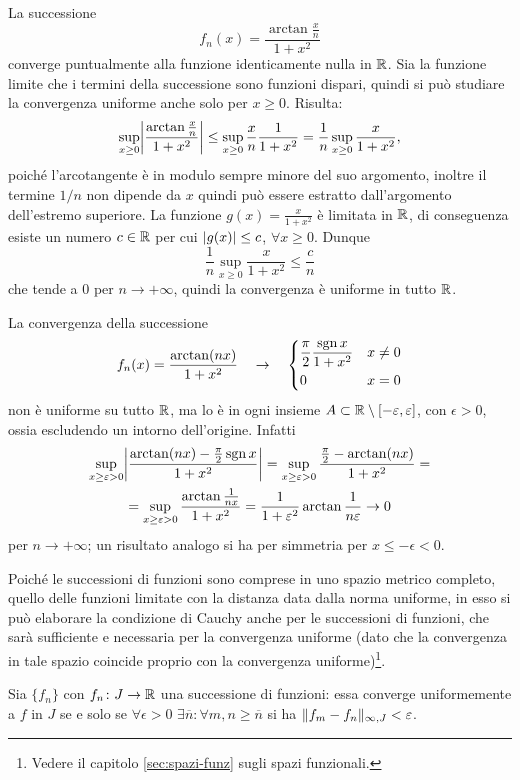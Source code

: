 \begin{esempio} \label{es:convergenza-uniforme-successioni-2}
	La successione
	\[
	f_n(x)=\frac{\arctan\frac{x}{n}}{1+x^2}
	\]
	converge puntualmente alla funzione identicamente nulla in $\R$. Sia la funzione limite che i termini della successione sono funzioni dispari, quindi si può studiare la convergenza uniforme anche solo per $x\geq 0$. Risulta:
	\[
		\sup_{x\geq 0}\abs[\bigg]{\frac{\arctan\frac{x}{n}}{1+x^2}}\leq\sup_{x\geq 0}\frac{x}{n}\frac1{1+x^2}=\frac1{n}\sup_{x\geq 0}\frac{x}{1+x^2},
	\]
	poiché l'arcotangente è in modulo sempre minore del suo argomento, inoltre il termine $1/n$ non dipende da $x$ quindi può essere estratto dall'argomento dell'estremo superiore. La funzione $g(x)=\frac{x}{1+x^2}$ è limitata in $\R$, di conseguenza esiste un numero $c\in\R$ per cui $\abs{g(x)}\leq c$, $\forall x\geq 0$. Dunque
	\[
	\frac1{n}\sup_{x\geq 0}\frac{x}{1+x^2}\leq\frac{c}{n}
	\]
	che tende a 0 per $n\to+\infty$, quindi la convergenza è uniforme in tutto $\R$.
\end{esempio}
\begin{esempio} \label{es:convergenza-uniforme-successioni-3}
	La convergenza della successione
	\[
	f_n(x)=\frac{\arctan(nx)}{1+x^2}\quad\to\quad\begin{dcases}\frac{\pi}2\frac{\sgn x}{1+x^2}&x\neq 0\\ 0&x=0\end{dcases}
	\]
	non è uniforme su tutto $\R$, ma lo è in ogni insieme $A\subset\R\setminus[-\epsilon,\epsilon]$, con $\epsilon>0$, ossia escludendo un intorno dell'origine. Infatti
	\begin{multline*}
		\sup_{x\geq\epsilon>0}\abs[\bigg]{\frac{\arctan(nx)-\frac{\pi}2\sgn x}{1+x^2}}=\sup_{x\geq\epsilon>0}\frac{\frac{\pi}2-\arctan(nx)}{1+x^2}=\\
	=\sup_{x\geq\epsilon>0}\frac{\arctan\frac1{nx}}{1+x^2}=\frac1{1+\epsilon^2}\arctan\frac1{n\epsilon}\to 0
	\end{multline*}
	per $n\to+\infty$; un risultato analogo si ha per simmetria per $x\leq -\epsilon<0$.
\end{esempio}
Poiché le successioni di funzioni sono comprese in uno spazio metrico completo, quello delle funzioni limitate con la distanza data dalla norma uniforme, in esso si può elaborare la condizione di Cauchy anche per le successioni di funzioni, che sarà sufficiente e necessaria per la convergenza uniforme (dato che la convergenza in tale spazio coincide proprio con la convergenza uniforme)\footnote{Vedere il capitolo \ref{sec:spazi-funz} sugli spazi funzionali.}.
\begin{teorema}
Sia $\{f_n\}$ con $f_n\colon J\to\R$ una successione di funzioni: essa converge uniformemente a $f$ in $J$ se e solo se $\forall\epsilon>0$ $\exists\overline{n}\colon\forall m,n\geq\overline{n}$ si ha $\norm{f_m-f_n}_{\infty,J}<\epsilon$.
\end{teorema}

